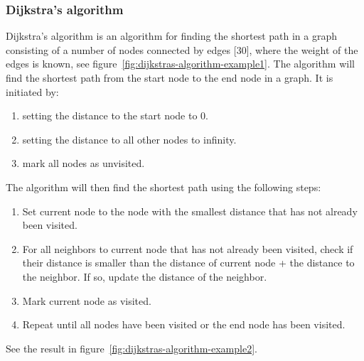 \documentclass {article}
\begin{document}
\subsubsection{Dijkstra's algorithm}
Dijkstra's algorithm is an algorithm for finding the shortest path in a graph consisting of a number of nodes connected by edges [30], where the weight of the edges is known, see figure~\ref{fig:dijkstras-algorithm-example1}. The algorithm will find the shortest path from the start node to the end node in a graph. It is initiated by:
\begin{enumerate}
\item setting the distance to the start node to 0.
\item setting the distance to all other nodes to infinity.
\item mark all nodes as unvisited.
\end{enumerate}
The algorithm will then find the shortest path using the following steps:
\begin{enumerate}
\item Set current node to the node with the smallest distance that has not already been visited.
\item For all neighbors to current node that has not already been visited, check if their distance is smaller than the distance of current node + the distance to the neighbor. If so, update the distance of the neighbor.
\item Mark current node as visited.
\item Repeat until all nodes have been visited or the end node has been visited.
\end{enumerate}
See the result in figure~\ref{fig:dijkstras-algorithm-example2}.
\end{document}
